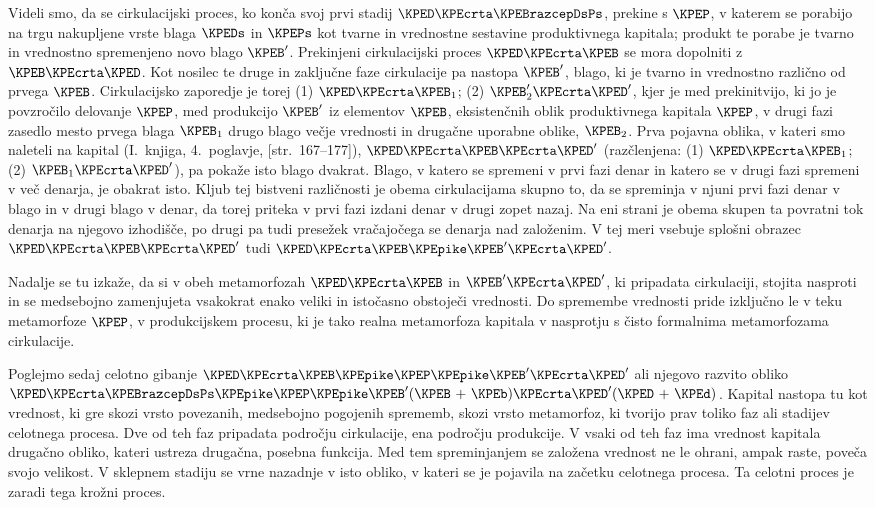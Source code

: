 \documentclass[kapital_02.tex]{subfiles}
\begin{document}
Videli smo, da se cirkulacijski proces, ko konča svoj prvi stadij \(\KPED\KPEcrta\KPEBrazcepDsPs\), prekine s \(\KPEP\), v katerem se porabijo na trgu nakupljene vrste blaga \(\KPEDs\) in \(\KPEPs\) kot tvarne in vrednostne sestavine produktivnega kapitala; produkt te porabe je tvarno in vrednostno spremenjeno novo blago \(\KPEB'\). Prekinjeni cirkulacijski proces \(\KPED\KPEcrta\KPEB\) se mora dopolniti z \(\KPEB\KPEcrta\KPED\). Kot nosilec te druge in zaključne faze cirkulacije pa nastopa \(\KPEB'\), blago, ki je tvarno in vrednostno različno od prvega \(\KPEB\). Cirkulacijsko zaporedje je torej (1) \(\KPED\KPEcrta\KPEB_1\); (2) \(\KPEB'_2\KPEcrta\KPED'\), kjer je med prekinitvijo, ki jo je povzročilo delovanje \(\KPEP\), med produkcijo \(\KPEB'\) iz elementov \(\KPEB\), eksistenčnih oblik produktivnega kapitala \(\KPEP\), v drugi fazi zasedlo mesto prvega blaga \(\KPEB_1\) drugo blago večje vrednosti in drugačne uporabne oblike, \(\KPEB_2\). Prva pojavna oblika, v kateri smo naleteli na kapital (I.\ knjiga, 4.\ poglavje, [str.\ 167--177]), \(\KPED\KPEcrta\KPEB\KPEcrta\KPED'\) (razčlenjena: (1) \(\KPED\KPEcrta\KPEB_1\); (2) \(\KPEB_1\KPEcrta\KPED'\)), pa pokaže isto blago dvakrat. Blago, v katero se spremeni v prvi fazi denar in katero se v drugi fazi spremeni v več denarja, je obakrat isto. Kljub tej bistveni različnosti je obema cirkulacijama skupno to, da se spreminja v \KPEstran njuni prvi fazi denar v blago in v drugi blago v denar, da torej priteka v prvi fazi izdani denar v drugi zopet nazaj. Na eni strani je obema skupen ta povratni tok denarja na njegovo izhodišče, po drugi pa tudi presežek vračajočega se denarja nad založenim. V tej meri vsebuje splošni obrazec \(\KPED\KPEcrta\KPEB\KPEcrta\KPED'\) tudi \(\KPED\KPEcrta\KPEB\KPEpike\KPEB'\KPEcrta\KPED'\).

Nadalje se tu izkaže, da si v obeh metamorfozah \(\KPED\KPEcrta\KPEB\) in \(\KPEB'\KPEcrta\KPED'\), ki pripadata cirkulaciji, stojita nasproti in se medsebojno zamenjujeta vsakokrat enako veliki in istočasno obstoječi vrednosti. Do spremembe vrednosti pride izključno le v teku metamorfoze \(\KPEP\), v produkcijskem procesu, ki je tako realna metamorfoza kapitala v nasprotju s čisto formalnima metamorfozama cirkulacije.

Poglejmo sedaj celotno gibanje \(\KPED\KPEcrta\KPEB\KPEpike\KPEP\KPEpike\KPEB'\KPEcrta\KPED'\) ali njegovo razvito obliko \(\KPED\KPEcrta\KPEBrazcepDsPs\KPEpike\KPEP\KPEpike\KPEB'(\KPEB \textrm{ + } \KPEb)\KPEcrta\KPED'(\KPED \textrm{ + } \KPEd)\). Kapital nastopa tu kot vrednost, ki gre skozi vrsto povezanih, medsebojno pogojenih sprememb, skozi vrsto metamorfoz, ki tvorijo prav toliko faz ali stadijev celotnega procesa. Dve od teh faz pripadata področju cirkulacije, ena področju produkcije. V vsaki od teh faz ima vrednost kapitala drugačno obliko, kateri ustreza drugačna, posebna funkcija. Med tem spreminjanjem se založena vrednost ne le ohrani, ampak raste, poveča svojo velikost. V sklepnem stadiju se vrne nazadnje v isto obliko, v kateri se je pojavila na začetku celotnega procesa. Ta celotni proces je zaradi tega krožni proces.
\end{document}
